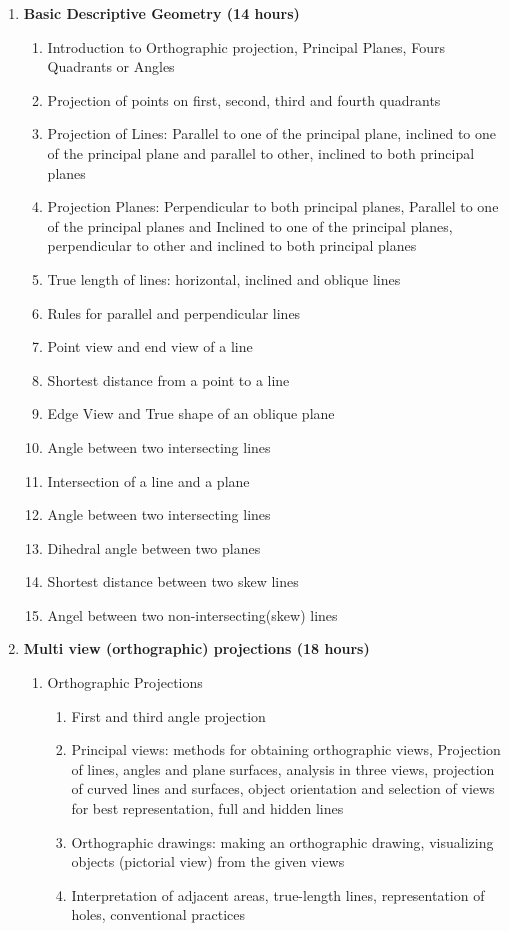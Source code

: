 \begin{enumerate}
    \item \textbf{Basic Descriptive Geometry \hfill (14 hours)}
    \begin{enumerate}
        \item Introduction to Orthographic projection, Principal Planes, Fours Quadrants or Angles
        \item Projection of points on first, second, third and fourth quadrants
        \item Projection of Lines: Parallel to one of the principal plane, inclined to one of the principal plane and parallel to other, inclined to both principal planes
        \item Projection Planes: Perpendicular to both principal planes, Parallel to one of the principal planes and Inclined to one of the principal planes, perpendicular to other and inclined to both principal planes
        \item True length of lines: horizontal, inclined and oblique lines
        \item Rules for parallel and perpendicular lines
        \item Point view and end view of a line
        \item Shortest distance from a point to a line
        \item Edge View and True shape of an oblique plane
        \item Angle between two intersecting lines
        \item Intersection of a line and a plane
        \item Angle between two intersecting lines
        \item Dihedral angle between two planes
        \item Shortest distance between two skew lines
        \item Angel between two non-intersecting(skew) lines
    \end{enumerate}
    
    
    \item \textbf{Multi view (orthographic) projections \hfill (18 hours)}
    \begin{enumerate}
        \item Orthographic Projections
        \begin{enumerate}
            \item First and third angle projection
            \item Principal views: methods for obtaining orthographic views, Projection of lines, angles and plane surfaces, analysis in three views, projection of curved lines and surfaces, object orientation and selection of views for best representation, full and hidden lines
            \item Orthographic drawings: making an orthographic drawing, visualizing objects (pictorial view) from the given views
            \item Interpretation of adjacent areas, true-length lines, representation of holes, conventional practices
        \end{enumerate}
        

\end{enumerate}
\end{enumerate}
